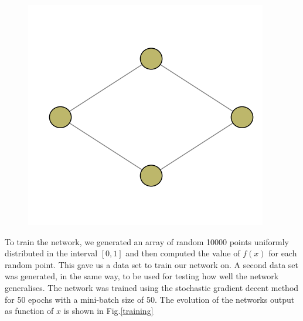 \documentclass[12pt,a4paper]{article}
\begin{document}
\begin{figure}
\center
\includegraphics[scale=0.5]{Images/net_1_2_1.png}
\caption{}
\label{DiamondNet}
\end{figure}


To train the network, we generated an array of random 10000 points uniformly distributed in the interval $[0,1]$ and then computed the value of $f(x)$ for each random point. This gave us a data set to train our network on. A second data set was generated, in the same way, to be used for testing how well the network generalises. The network was trained using the stochastic gradient decent method for 50 epochs with a mini-batch size of 50. The evolution of the networks output as function of $x$ is shown in Fig.\ref{training}
\end{document}
